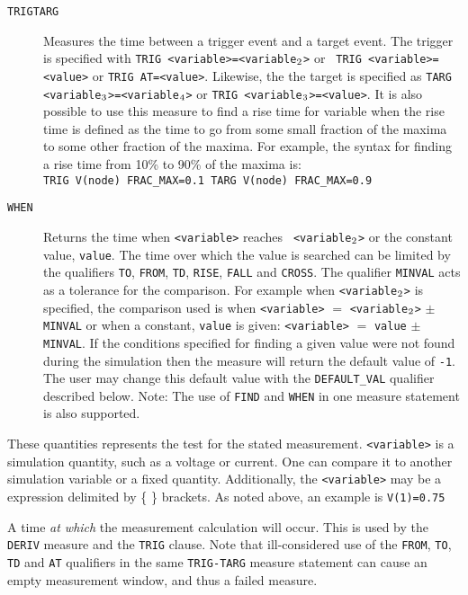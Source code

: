 \begin{Command}
\begin{Arguments}
\begin{description}
  \item[\vbox{\hbox{\tt TRIG\hfil}\hbox{\tt TARG\hfil}}] Measures the
    time between a trigger event and a target event.  The trigger is
    specified with {\tt TRIG <variable>=<variable\(\sb{2}\)>} or {\tt
    TRIG <variable>=<value>} or {\tt TRIG AT=<value>}.  Likewise, the
    the target is specified as {\tt TARG
    <variable\(\sb{3}\)>=<variable\(\sb{4}\)>} or {\tt TRIG
    <variable\(\sb{3}\)>=<value>}.  It is also possible to use this
    measure to find a rise time for variable when the rise time is
    defined as the time to go from some small fraction of the maxima
    to some other fraction of the maxima.  For example, the syntax for
    finding a rise time from 10\% to 90\% of the maxima
    is:\\ \texttt{TRIG V(node) FRAC\_MAX=0.1 TARG V(node)
    FRAC\_MAX=0.9}

  \item[\tt WHEN] Returns the time when {\tt <variable>} reaches {\tt
    <variable\(\sb{2}\)>} or the constant value, {\tt value}.  The
    time over which the value is searched can be limited by the
    qualifiers {\tt TO}, {\tt FROM}, {\tt TD}, {\tt RISE}, {\tt FALL}
    and {\tt CROSS}.  The qualifier {\tt MINVAL} acts as a tolerance
    for the comparison.  For example when {\tt <variable\(\sb{2}\)>}
    is specified, the comparison used is when {\tt <variable>} $=$
    {\tt <variable\(\sb{2}\)>} $\pm$ {\tt MINVAL} or when a constant,
    {\tt value} is given: {\tt <variable>} $=$ {\tt value} $\pm$ {\tt
    MINVAL}.  If the conditions specified for finding a given value
    were not found during the simulation then the measure will return
    the default value of {\tt -1}.  The user may change this default
    value with the {\tt DEFAULT\_VAL} qualifier described below.
    Note: The use of {\tt FIND} and {\tt WHEN} in one measure
    statement is also supported.
\end{description}


These quantities represents the test for the stated
measurement.  \texttt{<variable>} is a simulation quantity, such as a
voltage or current.  One can compare it to another simulation variable
or a fixed quantity.  Additionally, the \texttt{<variable>} may be
a \Xyce{} expression delimited by \{ \} brackets.  As noted above, an
example is {\tt V(1)=0.75}

A time {\em at which} the measurement calculation will occur.  This is
used by the {\tt DERIV} measure and the {\tt TRIG} clause.  Note that
ill-considered use of the {\tt FROM}, {\tt TO}, {\tt TD} and {\tt AT}
qualifiers in the same {\tt TRIG-TARG} measure statement can cause an
empty measurement window, and thus a failed measure.


\end{Arguments}
\end{Command}
